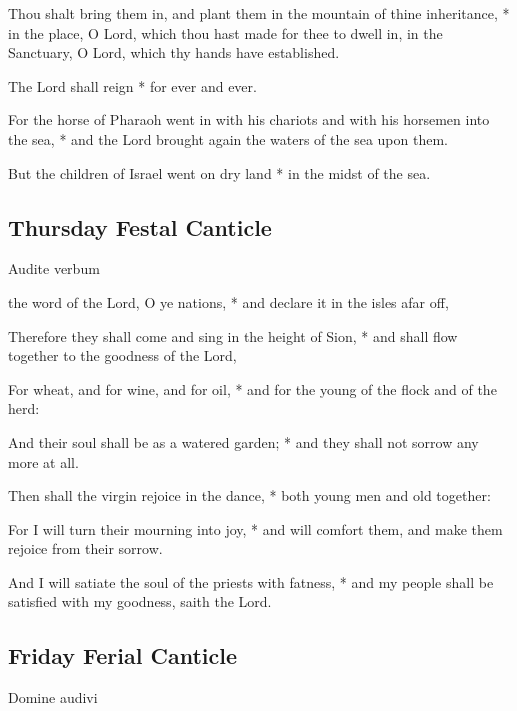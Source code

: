 \begin{multicols}{2}
Thou shalt bring them in, and plant them in the mountain of thine inheritance, * in the place, O Lord, which thou hast made for thee to dwell in, in the Sanctuary, O Lord, which thy hands have established.\par
The Lord shall reign * for ever and ever.\par
For the horse of Pharaoh went in with his chariots and with his horsemen into the sea, * and the Lord brought again the waters of the sea upon them.\par
But the children of Israel went on dry land * in the midst of the sea.

\subsection{Thursday Festal Canticle}

\begin{inhead}
Audite verbum
\end{inhead}

 the word of the Lord, O ye nations, * and declare it in the isles afar off,\par
{}
Therefore they shall come and sing in the height of Sion, * and shall flow together to the goodness of the Lord,\par
For wheat, and for wine, and for oil, * and for the young of the flock and of the herd:\par
And their soul shall be as a watered garden; * and they shall not sorrow any more at all.\par
Then shall the virgin rejoice in the dance, * both young men and old together:\par
For I will turn their mourning into joy, * and will comfort them, and make them rejoice from their sorrow.\par
And I will satiate the soul of the priests with fatness, * and my people shall be satisfied with my goodness, saith the Lord.

\subsection{Friday Ferial Canticle}

\begin{inhead}
Domine audivi
\end{inhead}


\end{multicols}
